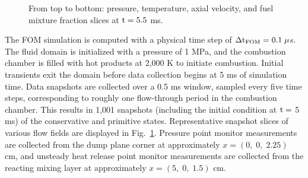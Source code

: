 \begin{figure}
\begin{minipage}{0.99\linewidth}
	\end{minipage}
	\begin{minipage}{0.99\linewidth}
	\end{minipage}
	\caption{\label{fig:cvrcFOMSlices}From top to bottom: pressure, temperature, axial velocity, and fuel mixture fraction slices at $\text{t} = 5.5$ ms.}
\end{figure}

The FOM simulation is computed with a physical time step of $\Delta \text{t}_{\text{FOM}} = 0.1 \; \mu$s. The fluid domain is initialized with a pressure of 1 MPa, and the combustion chamber is filled with hot products at 2,000 K to initiate combustion. Initial transients exit the domain before data collection begins at 5 ms of simulation time. Data snapshots are collected over a 0.5 ms window, sampled every five time steps, corresponding to roughly one flow-through period in the combustion chamber. This results in 1,001 snapshots (including the initial condition at $\text{t} =$ 5 ms) of the conservative and primitive states. Representative snapshot slices of various flow fields are displayed in Fig.~\ref{fig:cvrcFOMSlices}. Pressure point monitor measurements are collected from the dump plane corner at approximately $x = \left(0, \; 0, \; 2.25\right)$ cm, and unsteady heat release point monitor measurements are collected from the reacting mixing layer at approximately $x = \left(5, \; 0, \; 1.5\right)$ cm.

